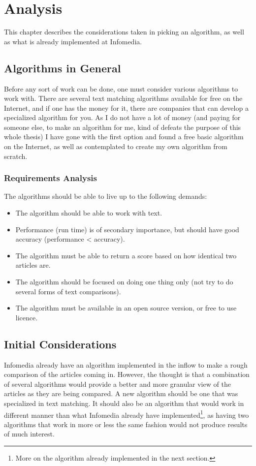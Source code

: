 \chapter{Analysis}

This chapter describes the considerations taken in picking an algorithm, as well as what is already implemented at Infomedia.

\section{Algorithms in General}
Before any sort of work can be done, one must consider various algorithms to work with. There are several text matching algorithms available for free on the Internet, and if one has the money for it, there are companies that can develop a specialized algorithm for you. As I do not have a lot of money (and paying for someone else, to make an algorithm for me, kind of defeats the purpose of this whole thesis) I have gone with the first option and found a free basic algorithm on the Internet, as well as contemplated to create my own algorithm from scratch.

\subsection{Requirements Analysis}
The algorithms should be able to live up to the following demands:

\begin{itemize}
	\item The algorithm should be able to work with text.
	\item Performance (run time) is of secondary importance, but should have good accuracy (performance < accuracy).
	\item The algorithm must be able to return a score based on how identical two articles are.
	\item The algorithm should be focused on doing one thing only (not try to do several forms of text comparisons).
	\item The algorithm must be available in an open source version, or free to use licence.
\end{itemize}

\section{Initial Considerations}
Infomedia already have an algorithm implemented in the inflow to make a rough comparison of the articles coming in. However, the thought is that a combination of several algorithms would provide a better and more granular view of the articles as they are being compared. A new algorithm should be one that was specialized in text matching. It should also be an algorithm that would work in different manner than what Infomedia already have implemented\footnote{More on the algorithm already implemented in the next section.}, as having two algorithms that work in more or less the same fashion would not produce results of much interest.

